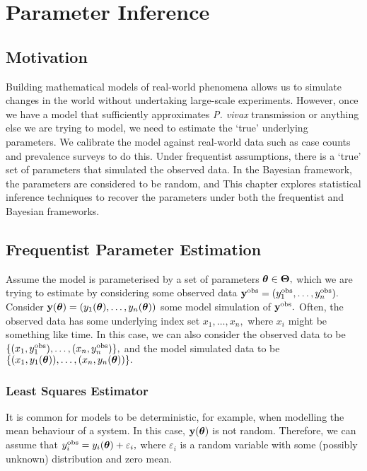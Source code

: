 \chapter{Parameter Inference}

\section{Motivation}

Building mathematical models of real-world phenomena allows us to
simulate changes in the world without undertaking large-scale
experiments. However, once we have a model that sufficiently approximates
\emph{P. vivax} transmission
or anything else we are trying to model,
we need to estimate the `true' underlying parameters.
We calibrate the model against real-world data such as case counts
and prevalence surveys to do this. 
Under frequentist assumptions, there is a `true' set of
parameters that simulated the observed data. In the Bayesian
framework, the parameters are considered to be random, and
This chapter explores statistical inference techniques to recover the
parameters under both the frequentist and Bayesian frameworks.

\section{Frequentist Parameter Estimation}

Assume the model is parameterised by a set of parameters
$\bm{\theta} \in \mathbf{\Theta},$ which
we are trying to estimate by considering some observed data
$\mathbf{y}^{\mathrm{obs}} = (y_1^{\mathrm{obs}}, \dots, y_n^{\mathrm{obs}}).$
Consider $\mathbf{y}(\bm{\theta}) = (y_1(\bm{\theta}), \dots, y_n(\bm{\theta}))$
some model simulation of
$\mathbf{y}^{\mathrm{obs}}.$ Often, the observed data has some underlying index set
$x_1, \dots, x_n,$ where $x_i$ might be something like time. In this case,
we can also consider the observed data to be
$\{(x_1, y_1^{\mathrm{obs}}), \dots, (x_n, y_n^{\mathrm{obs}})\},$ and the
model simulated data to be
$\{(x_1, y_1(\bm{\theta})), \dots, (x_n, y_n(\bm{\theta}))\}.$

\subsection*{Least Squares Estimator}

It is common for models to be deterministic, for example, when
modelling the mean behaviour
of a system. In this case, $\mathbf{y}(\bm{\theta})$ is not random. Therefore,
we can assume that $y^{\mathrm{obs}}_i = y_i(\bm{\theta}) + \varepsilon_i,$
where $\varepsilon_i$ is a random variable with some (possibly unknown)
distribution and zero mean.

